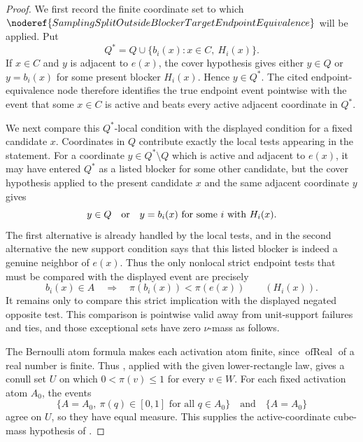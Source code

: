 \begin{proof}
We first record the finite coordinate set to which
\(\noderef{SamplingSplitOutsideBlockerTargetEndpointEquivalence}\) will be
applied.  Put
\[
  Q^*=Q\cup\{b_i(x):x\in C,\ H_i(x)\}.
\]
If \(x\in C\) and \(y\) is adjacent to \(e(x)\), the cover hypothesis gives
either \(y\in Q\) or \(y=b_i(x)\) for some present blocker \(H_i(x)\).  Hence
\(y\in Q^*\).  The cited endpoint-equivalence node therefore identifies the
true endpoint event pointwise with the event that some \(x\in C\) is active
and beats every active adjacent coordinate in \(Q^*\).

We next compare this \(Q^*\)-local condition with the displayed condition for
a fixed candidate \(x\).  Coordinates in \(Q\) contribute exactly the local
tests appearing in the statement.  For a coordinate \(y\in Q^*\setminus Q\)
which is active and adjacent to \(e(x)\), it may have entered \(Q^*\) as a
listed blocker for some other candidate, but the cover hypothesis applied to
the present candidate \(x\) and the same adjacent coordinate \(y\) gives
\[
  y\in Q\quad\hbox{or}\quad y=b_i(x)\hbox{ for some }i\hbox{ with }H_i(x).
\]
The first alternative is already handled by the local tests, and in the
second alternative the new support condition says that this listed blocker is
indeed a genuine neighbor of \(e(x)\).  Thus the only nonlocal strict endpoint
tests that must be compared with the displayed event are precisely
\[
  b_i(x)\in A \quad\Longrightarrow\quad \pi(b_i(x))<\pi(e(x))
  \qquad(H_i(x)).
\]
It remains only to compare this strict implication with the displayed negated
opposite test.  This comparison is pointwise valid away from unit-support
failures and ties, and those exceptional sets have zero \(\nu\)-mass as follows.

The Bernoulli atom formula makes each activation atom finite, since
\(\operatorname{ofReal}\) of a real number is finite.  Thus
, applied with the given
lower-rectangle law, gives a conull set \(U\) on which
\(0<\pi(v)\le1\) for every \(v\in W\).  For each fixed activation
atom \(A_0\), the events
\[
 \{A=A_0,\ \pi(q)\in[0,1]\text{ for all }q\in A_0\}
 \quad\text{and}\quad \{A=A_0\}
\]
agree on \(U\), so they have equal measure.  This supplies the
active-coordinate cube-mass hypothesis of
.


\end{proof}

